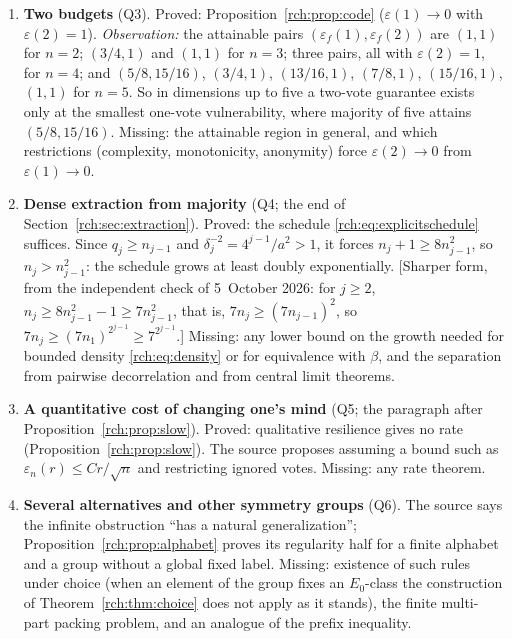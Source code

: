 \documentclass[11pt]{article}
\theoremstyle{definition}
\theoremstyle{remark}
\newcommand{\eps}{\varepsilon}
\begin{document}
\begin{enumerate}[leftmargin=*,label=\textbf{\arabic*.},ref=\arabic*]
 cores, which is what a classification of rules needs, and a stability
 statement for whole rules that is more than the known stability of
 cores.
\item\label{rch:q:tradeoff} \textbf{Two budgets} (Q3).
 Proved: Proposition~\ref{rch:prop:code} ($\eps(1)\to0$ with $\eps(2)=1$).
 \emph{Observation:} the attainable pairs $(\eps_f(1),\eps_f(2))$ are
 $(1,1)$ for $n=2$; $(3/4,1)$ and $(1,1)$ for $n=3$; three pairs, all with
 $\eps(2)=1$, for $n=4$; and $(5/8,15/16)$, $(3/4,1)$, $(13/16,1)$,
 $(7/8,1)$, $(15/16,1)$, $(1,1)$ for $n=5$. So in dimensions up to five a
 two-vote guarantee exists only at the smallest one-vote vulnerability,
 where majority of five attains $(5/8,15/16)$. Missing: the attainable
 region in general, and which restrictions (complexity, monotonicity,
 anonymity) force $\eps(2)\to0$ from $\eps(1)\to0$.
\item\label{rch:q:dense} \textbf{Dense extraction from majority} (Q4; the end
 of Section~\ref{rch:sec:extraction}). Proved: the schedule
 \eqref{rch:eq:explicitschedule} suffices. Since $q_j\ge n_{j-1}$ and
 $\delta_j^{-2}=4^{j-1}/a^2>1$, it forces $n_j+1\ge8n_{j-1}^2$, so
 $n_j>n_{j-1}^2$: the schedule grows at least doubly exponentially. [Sharper
 form, from the independent check of 5~October 2026: for $j\ge2$,
 $n_j\ge8n_{j-1}^2-1\ge7n_{j-1}^2$, that is, $7n_j\ge(7n_{j-1})^2$, so
 $7n_j\ge(7n_1)^{2^{j-1}}\ge7^{2^{j-1}}$.] Missing:
 any lower bound on the growth needed for bounded density
 \eqref{rch:eq:density} or for equivalence with $\beta$, and the separation
 from pairwise decorrelation and from central limit theorems.
\item\label{rch:q:mind} \textbf{A quantitative cost of changing one's mind}
 (Q5; the paragraph after Proposition~\ref{rch:prop:slow}). Proved:
 qualitative resilience gives no rate (Proposition~\ref{rch:prop:slow}).
 The source proposes assuming a bound such as $\eps_n(r)\le Cr/\sqrt n$ and
 restricting ignored votes. Missing: any rate theorem.
\item\label{rch:q:groups} \textbf{Several alternatives and other symmetry
 groups} (Q6). The source says the infinite obstruction ``has a natural
 generalization''; Proposition~\ref{rch:prop:alphabet} proves its regularity
 half for a finite alphabet and a group without a global fixed label.
 Missing: existence of such rules under choice (when an element of the group
 fixes an $E_0$-class the construction of Theorem~\ref{rch:thm:choice} does
 not apply as it stands), the finite multi-part packing problem, and an
 analogue of the prefix inequality.

\end{enumerate}
\end{document}
